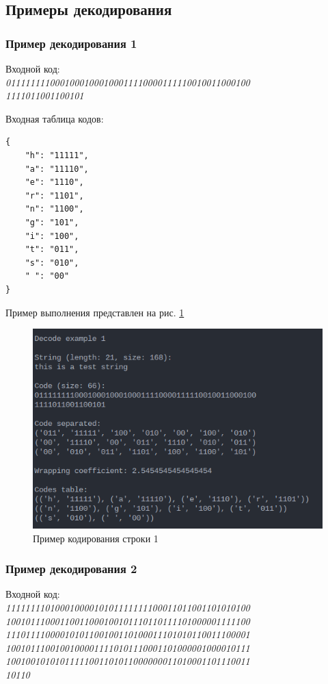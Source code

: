 \subsection{Примеры декодирования}


\subsubsection*{Пример декодирования 1}

Входной код:\\ 
\textit{
01111111100010001000100011110000111110010011000100\\
1111011001100101
}

Входная таблица кодов:\\ 
\begin{lstlisting}
{
    "h": "11111",
    "a": "11110",
    "e": "1110",
    "r": "1101",
    "n": "1100",
    "g": "101",
    "i": "100",
    "t": "011",
    "s": "010",
    " ": "00"
}
\end{lstlisting}

Пример выполнения представлен на рис. \ref{fig:decode_example_1}

\begin{figure}[H]
    \centering
    \includegraphics[width=0.7\linewidth]{photo/decode_example_1}
    \caption{Пример кодирования строки 1}
    \label{fig:decode_example_1}
\end{figure}

\subsubsection*{Пример декодирования 2}

Входной код:\\ 
\textit{
11111111010001000010101111111100011011001101010100\\
10010111000110011000100101110110111101000001111100\\
11101111000010101100100110100011101010110011100001\\
10010111001001000011110101110001101000001000010111\\
10010010101011111001101011000000011010001101110011\\
10110
}

